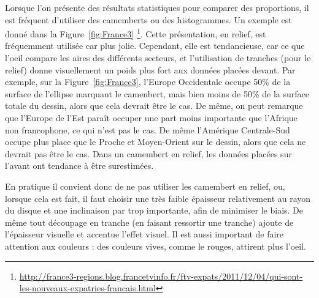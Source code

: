 \documentclass[10pt, a4paper]{article}
\begin{document}
Lorsque l’on présente des résultats statistiques pour comparer des proportions, il est fréquent d’utiliser des camemberts ou des histogrammes. Un exemple est donné dans la Figure~\ref{fig:France3} \footnote{\url{http://france3-regions.blog.francetvinfo.fr/ftv-expats/2011/12/04/qui-sont-les-nouveaux-expatries-francais.html}}. Cette présentation, en relief, est fréquemment
utilisée car plus jolie. Cependant, elle est tendancieuse, car ce que l’oeil compare les aires des différents secteurs, et l’utilisation de tranches (pour le relief) donne visuellement un poids plus fort aux données placées devant. 
Par exemple,
sur la Figure~\ref{fig:France3}, l’Europe Occidentale occupe 50\% de la surface de l’ellipse marquant le camenbert, mais bien moins
de 50\% de la surface totale du dessin, alors que cela devrait être le cas. De même, on peut remarque que l’Europe
de l’Est paraît occuper une part moins importante que l’Afrique non francophone, ce qui n’est pas le cas. De même
l’Amérique Centrale-Sud occupe plus place que le Proche et Moyen-Orient sur le dessin, alors que cela ne devrait pas
être le cas. Dans un camembert en relief, les données placées sur l’avant ont tendance à être surestimées. 

En pratique il
convient donc de ne pas utiliser les camembert en relief, ou, lorsque cela est fait, il faut choisir une très faible épaisseur
relativement au rayon du disque et une inclinaison par trop importante, afin de minimiser le biais. De même tout
découpage en tranche (en faisant ressortir une tranche) ajoute de l’épaisseur visuelle et accentue l’effet visuel. Il est
aussi important de faire attention aux couleurs : des couleurs vives, comme le rouges, attirent plus l’oeil.

\newpage
\end{document}
